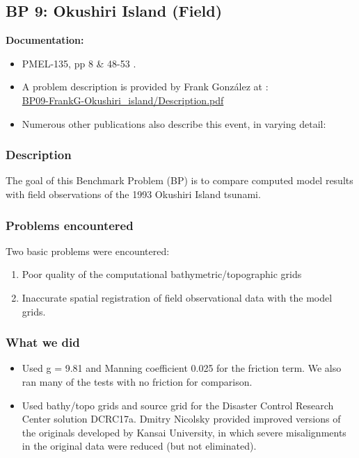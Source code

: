 \newsection

\subsection{BP 9:
 Okushiri Island (Field)} \label{sec:bp9}

{\bf Documentation:}
\begin{itemize} 
\item PMEL-135, pp 8 \& 48-53 \cite{SynolakisBernard:pmel135}.
\item A problem description is provided by Frank Gonz\'alez 
 at \cite{bp-description}:\\
\href{https://github.com/rjleveque/nthmp-benchmark-problems/blob/master/BP09-FrankG-Okushiri\_island/Description.pdf} 
{BP09-FrankG-Okushiri\_island/Description.pdf} 
\item Numerous other publications also describe this event, in varying detail: 
\cite{DCRC1994,HTSG1993,KatoTsuji1994,TakahashiEtAl1995,Takahashi1996}
\end{itemize} 

\subsubsection{Description}
The goal of this Benchmark Problem (BP) is to compare computed model results with field observations of the 1993 Okushiri Island tsunami.

\subsubsection {Problems encountered}
Two basic problems were encountered:
\begin {enumerate}
\item Poor quality of the computational bathymetric/topographic grids
\item Inaccurate spatial registration of field observational data with the model grids. 
\end{enumerate} 

\subsubsection{What we did}

\begin{itemize}
\item Used g = 9.81 and Manning coefficient 0.025 for the friction term.  We
also ran many of the tests with no friction for comparison.  
\item Used bathy/topo grids and source grid for the Disaster Control Research Center solution DCRC17a.  Dmitry Nicolsky provided improved versions of the originals developed by Kansai University, in which severe misalignments in the original data were reduced (but not eliminated).
\end{itemize}

